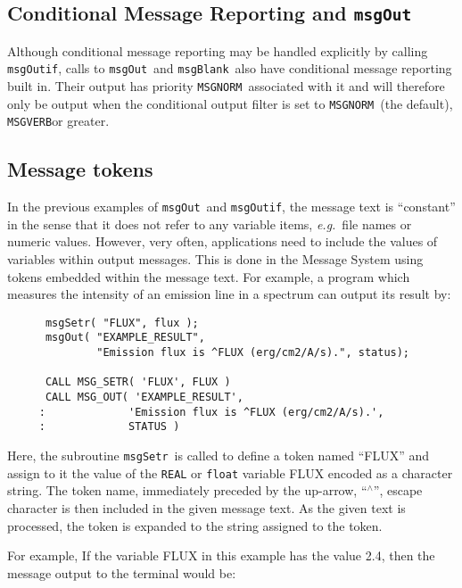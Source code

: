 \documentclass[twoside,11pt]{article}
\newcommand{\xlabel}[1]{}
\renewcommand{\_}{\texttt{\symbol{95}}}
\newcommand{\func}[1]{\texttt{#1}}
\newcommand{\const}[1]{\texttt{#1}}
\newcommand{\msgnorm}{\const{MSG\_\_NORM}}
\newcommand{\msgverb}{\const{MSG\_\_VERB}}
\newcommand{\msgblank}{\func{msgBlank}}
\newcommand{\msgout}{\func{msgOut}}
\newcommand{\msgoutif}{\func{msgOutif}}
\newcommand{\msgsetr}{\func{msgSetr}}
\begin{document}
\subsection{\xlabel{conditional_message_reporting_and_msg_out}Conditional Message Reporting and \msgout}

Although conditional message reporting may be handled explicitly by calling
\msgoutif, calls to \msgout\ and \msgblank\ also have conditional message
reporting built in.
Their output has priority \msgnorm\ associated with it and will therefore
only be output when the conditional output filter is set to \msgnorm\ (the 
default), \msgverb or greater.

\subsection{\xlabel{message_tokens}Message tokens}
In the previous examples of \msgout\ and \msgoutif, the message text is 
``constant'' in the sense that it does not refer to any variable items, 
\textit{e.g.}\ file names or numeric values. 
However, very often, applications need to include the values of
variables within output messages. 
This is done in the Message System using tokens embedded within the message
text.
For example, a program which measures the intensity of an emission line in
a spectrum can output its result by:

\begin {small}
\begin{verbatim}
      msgSetr( "FLUX", flux );
      msgOut( "EXAMPLE_RESULT",
              "Emission flux is ^FLUX (erg/cm2/A/s).", status);

      CALL MSG_SETR( 'FLUX', FLUX )
      CALL MSG_OUT( 'EXAMPLE_RESULT', 
     :             'Emission flux is ^FLUX (erg/cm2/A/s).',
     :             STATUS )
\end{verbatim}
\end {small}

Here, the subroutine \msgsetr\ is called to define a token named ``FLUX''
and assign to it the value of the \texttt{REAL} or \texttt{float} variable FLUX encoded as a character 
string.
The token name, immediately preceded by the up-arrow, ``$^\wedge$'', escape 
character is then included in the given message text. 
As the given text is processed, the token is expanded to the string assigned to
the token.

For example, If the variable FLUX in this example has the value 2.4, then
the message output to the terminal would be:
\end{document}
